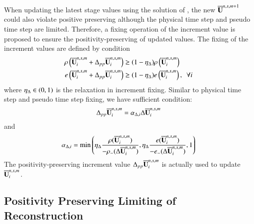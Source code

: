 \documentclass[preprint,12pt]{elsarticle}
\begin{document}
When updating the latest stage values using the solution of
, the new $\overline{\mathbf{U}}^{n,s,m+1}$ could also 
violate positive preserving although the physical time step and 
pseudo time step are limited.
Therefore, a fixing operation of the increment value is proposed 
to ensure the positivity-preserving of updated values.
The fixing of the increment values are defined by condition
\begin{equation}
    \label{eq:ppLimitInc}
    \begin{aligned}
        \rho\left(\overline{\mathbf{U}}_i^{n,s,m} + \mathrm\Delta_{pp} \overline{\mathbf{U}}_i^{n,s,m}\right)
         & \geq
        (1- \eta_\mathrm\Delta)
        \rho\left(\overline{\mathbf{U}}_i^{n,s,m}\right) \\
        e\left(\overline{\mathbf{U}}_i^{n,s,m} + \mathrm\Delta_{pp} \overline{\mathbf{U}}_i^{n,s,m}\right)
         & \geq
        (1- \eta_\mathrm\Delta)
        e\left(\overline{\mathbf{U}}_i^{n,s,m}\right), \ \ \forall i
    \end{aligned}
\end{equation}
where $\eta_\mathrm\Delta \in (0,1)$ is the relaxation in increment fixing.
Similar to physical time step and pseudo time step fixing, 
we have sufficient condition: 
\begin{equation}
    \mathrm\Delta_{pp} \overline{\mathbf{U}}_i^{n,s,m} = \alpha_{\mathrm\Delta,i} \mathrm\Delta \overline{\mathbf{U}}_i^{n,s,m}
\end{equation} 
and
\begin{equation}
    \alpha_{\mathrm\Delta,i} = \min\left(
        \eta_\mathrm\Delta\frac{\rho(\overline{\mathbf{U}}_i^{n,s,m})}{-\rho_-(\mathrm\Delta \overline{\mathbf{U}}_i^{n,s,m})},
        \eta_\mathrm\Delta\frac{e(\overline{\mathbf{U}}_i^{n,s,m})}{-e_-(\mathrm\Delta \overline{\mathbf{U}}_i^{n,s,m})},
        1
        \right)
\end{equation}
The positivity-preserving increment value $\mathrm\Delta_{pp} \overline{\mathbf{U}}_i^{n,s,m}$
is actually used to update $\overline{\mathbf{U}}_i^{n,s,m}$.

\subsection{Positivity Preserving Limiting of Reconstruction}
\end{document}
